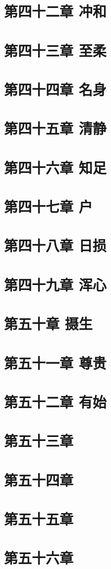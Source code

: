 \documentclass[UTF8]{ctexart}
\begin{document}
	\section{第四十二章 冲和}
	\section{第四十三章 至柔}
	\section{第四十四章 名身}
	\section{第四十五章 清静}
	\section{第四十六章 知足}
	\section{第四十七章 户}
	\section{第四十八章 日损}
	\section{第四十九章 浑心}
	\section{第五十章 摄生}
	\section{第五十一章 尊贵}
	\section{第五十二章 有始}
	\section{第五十三章}
	\section{第五十四章}
	\section{第五十五章}
	\section{第五十六章}
\end{document}
